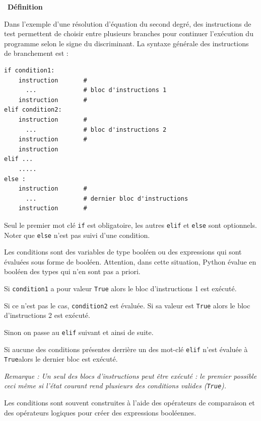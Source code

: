\documentclass[a4paper, french, 12pt]{article}  %
\newcounter{rque}
\newcounter{def}
\newenvironment{definition}[1]
{\par \medskip   \addtocounter{def}{1} \noindent  
\begin{bclogo}[arrondi =0.1,  ombre = true, barre=none, logo=\bcbook, marge=4]{~\textbf{Définition} \textbf{\thedef} {\itshape #1} }  \par}
{
\end{bclogo}
 \par \bigskip }
\newcounter{prog}
\newcounter{logi}
\begin{document}
\begin{definition}{}

Dans l'exemple d'une résolution d'équation du second degré, des instructions de test permettent de choisir entre plusieurs branches pour continuer l'exécution du programme selon le signe du discriminant. La syntaxe générale des instructions de branchement est :

 
\begin{lstlisting}[style=rond]
if condition1:
    instruction       #
      ...             # bloc d'instructions 1
    instruction       #
elif condition2:
    instruction       #
      ...             # bloc d'instructions 2
    instruction       #
    instruction
elif ...
    .....
else :     
    instruction       #
      ...             # dernier bloc d'instructions 
    instruction       #

\end{lstlisting}

Seul le premier mot clé \verb+if+ est obligatoire, les autres \verb+elif+ et \verb+else+ sont optionnels. Noter que \verb+else+ n'est pas suivi d'une condition.

Les conditions sont des variables de type booléen ou des expressions qui sont évaluées sous forme de booléen. Attention, dans cette situation, Python évalue en booléen des types qui n'en sont pas a priori.

Si \verb+condition1+ a pour valeur \verb+True+ alors le bloc d'instructions 1 est exécuté. 

Si ce n'est pas le cas, \verb+condition2+ est évaluée. Si sa valeur est \verb+True+ alors le bloc d'instructions 2 est exécuté.

Sinon on passe au \verb+elif+ suivant et ainsi de suite.

Si aucune des conditions présentes derrière un des mot-clé \verb+elif+ n'est évaluée à \verb+True+alors le dernier bloc est exécuté. 

\textit{Remarque : Un seul des blocs d'instructions peut être exécuté : le premier possible ceci même si l'état courant rend plusieurs des conditions valides (\texttt{True}).}

Les conditions sont souvent construites à l'aide des opérateurs de comparaison et des opérateurs logiques  pour créer des expressions booléennes.


\end{definition}
\end{document}
